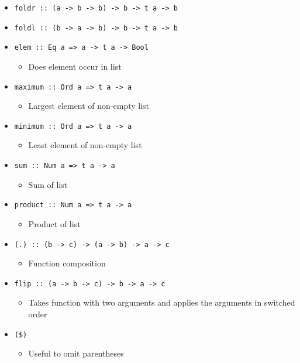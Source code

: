 \begin{itemize}
\begin{itemize}
\begin{itemize}
                \end{itemize}
        \end{itemize}
    \item \verb+foldr :: (a -> b -> b) -> b -> t a -> b+
    \item \verb+foldl :: (b -> a -> b) -> b -> t a -> b+
    \item \verb+elem :: Eq a => a -> t a -> Bool+
        \begin{itemize}
            \item Does element occur in list
        \end{itemize}
    \item \verb+maximum :: Ord a => t a -> a+
        \begin{itemize}
            \item Largest element of non-empty list
        \end{itemize}
    \item \verb+minimum :: Ord a => t a -> a+
        \begin{itemize}
            \item Least element of non-empty list
        \end{itemize}
    \item \verb+sum :: Num a => t a -> a+
        \begin{itemize}
            \item Sum of list
        \end{itemize}
    \item \verb+product :: Num a => t a -> a+
        \begin{itemize}
            \item Product of list
        \end{itemize}
    \item \verb+(.) :: (b -> c) -> (a -> b) -> a -> c+
        \begin{itemize}
            \item Function composition
        \end{itemize}
    \item \verb+flip :: (a -> b -> c) -> b -> a -> c+
        \begin{itemize}
            \item Takes function with two arguments and applies the arguments in switched order
        \end{itemize}
    \item \verb+($)+
        \begin{itemize}
            \item Useful to omit parentheses

\end{itemize}
\end{itemize}
